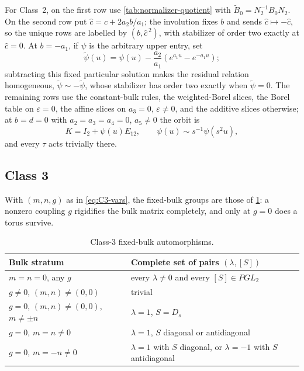 \documentclass[11pt,reqno]{amsart}
\theoremstyle{plain}
\theoremstyle{definition}
\theoremstyle{remark}
\numberwithin{equation}{section}
\newcommand{\Id}{I_2}
\begin{document}
For Class~2, on the first row use \cref{tab:normalizer-quotient} with
$\widetilde B_0=N_2^{-1}B_0N_2$. On the second row put
$\widehat c=c+2a_2b/a_1$; the involution fixes $b$ and sends
$\widehat c\mapsto-\widehat c$, so the unique rows are labelled by
$(b,\widehat c^{\,2})$, with stabilizer of order two exactly at $\widehat c=0$.
At $b=-a_1$, if $\psi$ is the arbitrary upper entry, set
\begin{equation}
\widetilde\psi(u)=\psi(u)-\frac{a_2}{a_1}\left(e^{a_1u}-e^{-a_1u}\right);
\label{eq:C2-shifted-function}
\end{equation}
subtracting this fixed particular solution makes the residual relation homogeneous,
$\widetilde\psi\sim-\widetilde\psi$, whose stabilizer has order two exactly when
$\widetilde\psi=0$. The remaining rows use the constant-bulk rules, the
weighted-Borel slices, the Borel table on $\varepsilon=0$, the affine slices on
$a_3=0$, $\varepsilon\ne0$, and the additive slices otherwise; at $b=d=0$ with
$a_2=a_3=a_4=0$, $a_5\ne0$ the orbit is
\begin{equation}
K=\Id+\psi(u)E_{12},\qquad \psi(u)\sim s^{-1}\psi(s^2u),       \label{eq:C2-weighted-upper}
\end{equation}
and every $\tau$ acts trivially there.

\subsection{Class 3}

With $(m,n,g)$ as in \cref{eq:C3-vars}, the fixed-bulk groups are those of
\cref{tab:C3-aut}: a nonzero coupling $g$ rigidifies the bulk matrix completely,
and only at $g=0$ does a torus survive.

\begin{table}[t]
\centering\small
\caption{Class-3 fixed-bulk automorphisms.}
\label{tab:C3-aut}
\begin{tabularx}{\textwidth}{X X}
\toprule
Bulk stratum & Complete set of pairs $(\lambda,[S])$ \\
\midrule
$m=n=0$, any $g$ & every $\lambda\ne0$ and every $[S]\in PGL_2$ \\
$g\ne0$, $(m,n)\ne(0,0)$ & trivial \\
$g=0$, $(m,n)\ne(0,0)$, $m\ne\pm n$ & $\lambda=1$, $S=D_s$ \\
$g=0$, $m=n\ne0$ & $\lambda=1$, $S$ diagonal or antidiagonal \\
$g=0$, $m=-n\ne0$ & $\lambda=1$ with $S$ diagonal, or $\lambda=-1$ with $S$ antidiagonal \\
\bottomrule
\end{tabularx}
\end{table}
\end{document}
